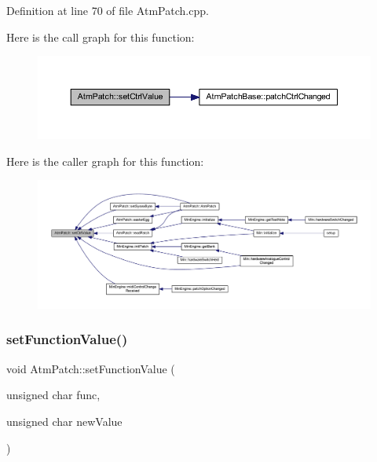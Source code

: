 Definition at line 70 of file Atm\+Patch.\+cpp.

Here is the call graph for this function\+:
\nopagebreak
\begin{figure}[H]
\begin{center}
\leavevmode
\includegraphics[width=350pt]{class_atm_patch_a95fb3ea0dfd3369abe7518da26edb1b5_cgraph}
\end{center}
\end{figure}
Here is the caller graph for this function\+:
\nopagebreak
\begin{figure}[H]
\begin{center}
\leavevmode
\includegraphics[width=350pt]{class_atm_patch_a95fb3ea0dfd3369abe7518da26edb1b5_icgraph}
\end{center}
\end{figure}
\mbox{\label{class_atm_patch_ad2fe7a265755afc95a36752b86b6a7e2}} 
\subsubsection{\texorpdfstring{set\+Function\+Value()}{setFunctionValue()}}
{\footnotesize\ttfamily void Atm\+Patch\+::set\+Function\+Value (\begin{DoxyParamCaption}\item[{unsigned char}]{func,  }\item[{unsigned char}]{new\+Value }\end{DoxyParamCaption})}



